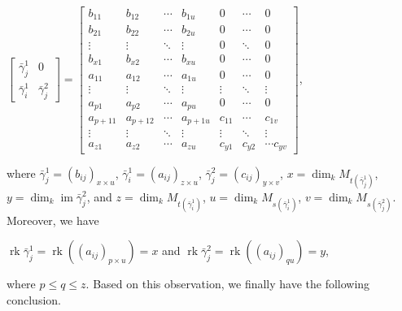 \documentclass[a4paper,12pt]{amsart}
\newcommand{\bg}{\bar{\gamma}}
\DeclareMathOperator{\rk}{rk}
\DeclareMathOperator{\im}{im}
\begin{document}
\begin{center}
 $ \begin{bmatrix}
\bg^1_j & 0\\
\bg^1_i & \bg^2_j
\end{bmatrix}=\begin{bmatrix}
b_{11} & b_{12} & \cdots & b_{1u} & 0 &\cdots & 0 \\
b_{21} &  b_{22} & \cdots & b_{2u} & 0 &  \cdots & 0 \\
\vdots & \vdots & \ddots & \vdots & 0 &  \ddots & 0 \\
b_{x1} & b_{x2} & \cdots &b_{xu} & 0 & \cdots & 0 \\
a_{11} & a_{12} & \cdots & a_{1u} & 0 & \cdots  & 0  \\
\vdots & \vdots & \ddots & \vdots  & \vdots & \ddots & \vdots \\
a_{p1} &  a_{p2} & \cdots & a_{pu} &0 & \cdots & 0 \\
a_{p+1 1} &  a_{p+1 2} & \cdots & a_{p+1 u} & c_{11} & \cdots & c_{1v} \\
\vdots & \vdots & \ddots & \vdots  & \vdots & \ddots & \vdots \\
a_{z1} & a_{z2} & \cdots &a_{zu}  & c_{y1} & c_{y2} & \cdots c_{yv} \end{bmatrix}$,  



\end{center}
where $\bg^1_j=(b_{ij})_{x\times u}$, $\bg^1_i=(a_{ij})_{z\times u}$, $\bg^2_j=(c_{ij})_{y\times v}$, \hspace{0.1cm} $x=\dim_k M_{t(\bg^1_j)}$, $y=\dim_k \im \bg^2_j$, and $z=\dim_k M_{t(\bg^1_i)}$, $u=\dim_k M_{s(\bg^1_i)}$, $v=\dim_k M_{s(\bg^2_j)}$. Moreover, we have
\begin{center}
$\rk \bg^1_j=\rk ((a_{ij})_{p\times u})=x$ and $\rk \bg^2_j=\rk ((a_{ij})_{qu})=y$,
\end{center}
where $p\leq q \leq z$.  Based on this observation,  we finally have the following conclusion.
\end{document}

